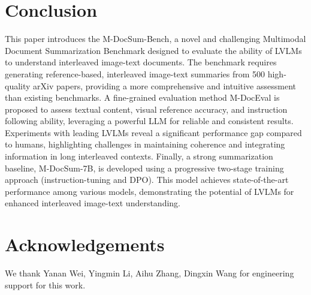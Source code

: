 \section{Conclusion}
This paper introduces the M-DocSum-Bench, a novel and challenging Multimodal Document Summarization Benchmark designed to evaluate the ability of LVLMs to understand interleaved image-text documents.
The benchmark requires generating reference-based, interleaved image-text summaries from 500 high-quality arXiv papers, providing a more comprehensive and intuitive assessment than existing benchmarks.
A fine-grained evaluation method M-DocEval is proposed to assess textual content, visual reference accuracy, and instruction following ability, leveraging a powerful LLM for reliable and consistent results. 
Experiments with leading LVLMs reveal a significant performance gap compared to humans, highlighting challenges in maintaining coherence and integrating information in long interleaved contexts.
Finally, a strong summarization baseline, M-DocSum-7B, is developed using a progressive two-stage training approach (instruction-tuning and DPO). This model achieves state-of-the-art performance among various models, demonstrating the potential of LVLMs for enhanced interleaved image-text understanding.

\section*{Acknowledgements}
We thank Yanan Wei, Yingmin Li, Aihu Zhang, Dingxin Wang for engineering support for this work.